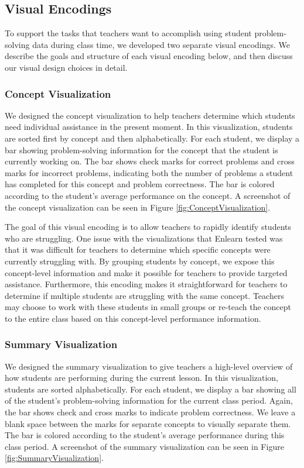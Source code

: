 \documentclass{sigchi}
\begin{document}
\subsection{Visual Encodings}
To support the tasks that teachers want to accomplish using student problem-solving data during class time, we developed two separate visual encodings. We describe the goals and structure of each visual encoding below, and then discuss our visual design choices in detail.

\subsubsection{Concept Visualization}
We designed the concept visualization to help teachers determine which students need individual assistance in the present moment. In this visualization, students are sorted first by concept and then alphabetically. For each student, we display a bar showing problem-solving information for the concept that the student is currently working on. The bar shows check marks for correct problems and cross marks for incorrect problems, indicating both the number of problems a student has completed for this concept and problem correctness. The bar is colored according to the student's average performance on the concept. A screenshot of the concept visualization can be seen in Figure \ref{fig:ConceptVisualization}.

The goal of this visual encoding is to allow teachers to rapidly identify students who are struggling. One issue with the visualizations that Enlearn tested was that it was difficult for teachers to determine which specific concepts were currently struggling with. By grouping students by concept, we expose this concept-level information and make it possible for teachers to provide targeted assistance. Furthermore, this encoding makes it straightforward for teachers to determine if multiple students are struggling with the same concept. Teachers may choose to work with these students in small groups or re-teach the concept to the entire class based on this concept-level performance information.

\subsubsection{Summary Visualization}
We designed the summary visualization to give teachers a high-level overview of how students are performing during the current lesson. In this visualization, students are sorted alphabetically. For each student, we display a bar showing all of the student's problem-solving information for the current class period. Again, the bar shows check and cross marks to indicate problem correctness. We leave a blank space between the marks for separate concepts to visually separate them. The bar is colored according to the student's average performance during this class period. A screenshot of the summary visualization can be seen in Figure \ref{fig:SummaryVisualization}.
\end{document}
